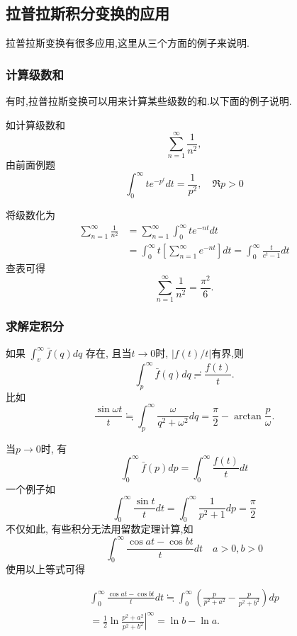 \subsection{拉普拉斯积分变换的应用}
\label{subsec:applications}
拉普拉斯变换有很多应用,这里从三个方面的例子来说明.
\subsubsection{计算级数和}
有时,拉普拉斯变换可以用来计算某些级数的和.以下面的例子说明.

如计算级数和
$$
    \sum_{n=1} ^{\infty}  \frac{1}{n^2},
$$
由前面例题
$$
\int_0^{\infty} t e^{-p^t} d t=\frac{1}{p^2}, \quad \Re p>0
$$

将级数化为
$$
\begin{aligned}
\sum_{n= 1}^{\infty} \frac{1}{n^2} & =\sum_{n=1}^{\infty} \int_0^{\infty} t e^{-n t} d t \\
& =\int_0^{\infty} t\left[\sum_{n=1}^{\infty} e^{-n t}\right] d t=\int_0^{\infty} \frac{t}{e^t-1} d t
\end{aligned}
$$
查表可得
\begin{equation}
    \sum_{n=1} ^{\infty}  \frac{1}{n^2} = \frac{\pi^2}{6}.
\end{equation}

\subsubsection{求解定积分}
如果 $\int_v^{\infty} \bar{f}(q) d q$ 存在, 且当$t\to 0$时, $|f(t)/t|$有界,则
\begin{equation}
    \int_{p}^{\infty} \bar{f}(q) dq \risingdotseq \frac{f(t)}{t} . 
\end{equation}
比如
$$
\frac{\sin \omega t}{t} \fallingdotseq \int_p^{\infty} \frac{\omega}{q^2+\omega^2} d q=\frac{\pi}{2}-\arctan \frac{p}{\omega}.
$$

当$p\to 0$时, 有
\begin{equation}
    \int_0^{\infty} \bar{f}(p) d p=\int_0^{\infty} \frac{f(t)}{t} d t
\end{equation}
一个例子如
$$
\int_0^{\infty} \frac{\sin t}{t} d t=\int_0^{\infty} \frac{1}{p^2+1} d p=\frac{\pi}{2}
$$
不仅如此, 有些积分无法用留数定理计算,如
$$
\int_0^{\infty} \frac{\cos a t-\cos b t}{t} d t \quad a>0, b>0
$$
使用以上等式可得

$$
\begin{gathered}
\int_0^{\infty} \frac{\cos a t-\cos b t}{t} d t \fallingdotseq \int_0^{\infty}\left(\frac{p}{p^2+a^2}-\frac{p}{p^2+b^2}\right) d p \\
=\left.\frac{1}{2} \ln \frac{p^2+a^2}{p^2+b^2}\right|^{\infty}=\ln b-\ln a .
\end{gathered}
$$

